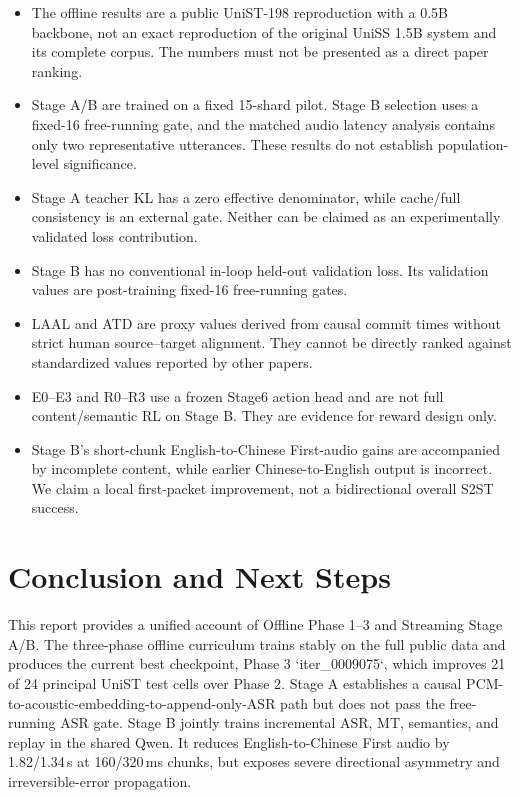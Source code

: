 \documentclass[11pt,a4paper]{article}
\begin{document}
\begin{itemize}
  \item The offline results are a public UniST-198 reproduction with a 0.5B backbone, not an exact reproduction of the original UniSS 1.5B system and its complete corpus. The numbers must not be presented as a direct paper ranking.
  \item Stage A/B are trained on a fixed 15-shard pilot. Stage B selection uses a fixed-16 free-running gate, and the matched audio latency analysis contains only two representative utterances. These results do not establish population-level significance.
  \item Stage A teacher KL has a zero effective denominator, while cache/full consistency is an external gate. Neither can be claimed as an experimentally validated loss contribution.
  \item Stage B has no conventional in-loop held-out validation loss. Its validation values are post-training fixed-16 free-running gates.
  \item LAAL and ATD are proxy values derived from causal commit times without strict human source--target alignment. They cannot be directly ranked against standardized values reported by other papers.
  \item E0--E3 and R0--R3 use a frozen Stage6 action head and are not full content/semantic RL on Stage B. They are evidence for reward design only.
  \item Stage B's short-chunk English-to-Chinese First-audio gains are accompanied by incomplete content, while earlier Chinese-to-English output is incorrect. We claim a local first-packet improvement, not a bidirectional overall S2ST success.
\end{itemize}

\section{Conclusion and Next Steps}

This report provides a unified account of Offline Phase 1--3 and Streaming Stage A/B. The three-phase offline curriculum trains stably on the full public data and produces the current best checkpoint, Phase 3 `iter\_0009075`, which improves 21 of 24 principal UniST test cells over Phase 2. Stage A establishes a causal PCM-to-acoustic-embedding-to-append-only-ASR path but does not pass the free-running ASR gate. Stage B jointly trains incremental ASR, MT, semantics, and replay in the shared Qwen. It reduces English-to-Chinese First audio by 1.82/1.34\,s at 160/320\,ms chunks, but exposes severe directional asymmetry and irreversible-error propagation.
\end{document}
